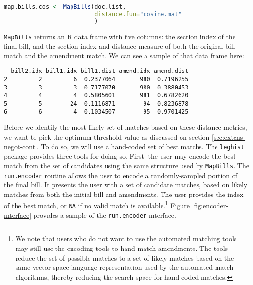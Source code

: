 \documentclass[11pt]{article}
\begin{document}
\begin{lstlisting}[language=R, numbers=none]
map.bills.cos <- MapBills(doc.list,
                          distance.fun="cosine.mat"
                          )
\end{lstlisting}

\texttt{MapBills} returns an R data frame with five columns: the
section index of the final bill, and the section index and distance
measure of both the original bill match and the amendment match. We
can see a sample of that data frame here:

\begin{verbatim}
  bill2.idx bill1.idx bill1.dist amend.idx amend.dist
2         2         6  0.2377064       980  0.7196255
3         3         3  0.7177070       980  0.3880453
4         4         4  0.5805601       981  0.6782620
5         5        24  0.1116871        94  0.8236878
6         6         4  0.1034507        95  0.9701425
\end{verbatim}

Before we identify the most likely set of matches based on these
distance metrics, we want to pick the optimum threshold value as
discussed on section \ref{sec:extens-negot-cont}. To do so, we will
use a hand-coded set of best matchs. The \texttt{leghist} package
provides three tools for doing so. First, the user may encode the best
match from the set of candidates using the same structure used by
\texttt{MapBills}. The \texttt{run.encoder} routine allows the user to
encode a randomly-sampled portion of the final bill. It presents the
user with a set of candidate matches, based on likely matches from
both the initial bill and amendments. The user provides the index of
the best match, or \texttt{NA} if no valid match is
available.\footnote{We note that users who do not want to use the
  automated matching tools may still use the encoding tools to
  hand-match amendments. The tools reduce the set of possible matches
  to a set of likely matches based on the same vector space language
  representation used by the automated match algorithms, thereby
  reducing the search space for hand-coded matches.} Figure
\ref{fig:encoder-interface} provides a sample of the 
\texttt{run.encoder} interface.
\end{document}
